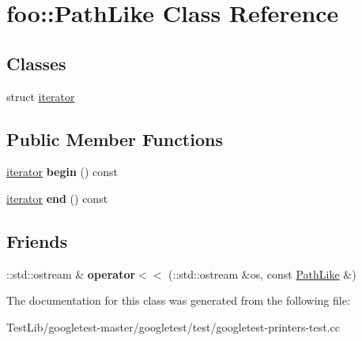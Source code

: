 \hypertarget{classfoo_1_1PathLike}{}\section{foo\+:\+:Path\+Like Class Reference}
\label{classfoo_1_1PathLike}
\subsection*{Classes}
\begin{DoxyCompactItemize}
\item 
struct \hyperlink{structfoo_1_1PathLike_1_1iterator}{iterator}
\end{DoxyCompactItemize}
\subsection*{Public Member Functions}
\begin{DoxyCompactItemize}
\item 
\mbox{\label{classfoo_1_1PathLike_a7ca8b63139fd6fcada55fbf13ccf9c83}} 
\hyperlink{structfoo_1_1PathLike_1_1iterator}{iterator} {\bfseries begin} () const
\item 
\mbox{\label{classfoo_1_1PathLike_aca85cd005890f1d19f416ca7e2c95f02}} 
\hyperlink{structfoo_1_1PathLike_1_1iterator}{iterator} {\bfseries end} () const
\end{DoxyCompactItemize}
\subsection*{Friends}
\begin{DoxyCompactItemize}
\item 
\mbox{\label{classfoo_1_1PathLike_ab5544a5497a8a470802bd8fcf97c49da}} 
\+::std\+::ostream \& {\bfseries operator$<$$<$} (\+::std\+::ostream \&os, const \hyperlink{classfoo_1_1PathLike}{Path\+Like} \&)
\end{DoxyCompactItemize}


The documentation for this class was generated from the following file\+:\begin{DoxyCompactItemize}
\item 
Test\+Lib/googletest-\/master/googletest/test/googletest-\/printers-\/test.\+cc\end{DoxyCompactItemize}
